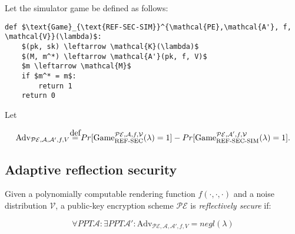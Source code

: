 \documentclass{article}
\newcommand\defeq{\stackrel{\mathclap{\normalfont\mbox{def}}}{=}}
\begin{document}
Let the simulator game be defined as follows:

\begin{lstlisting}[texcl,mathescape]
def $\text{Game}_{\text{REF-SEC-SIM}}^{\mathcal{PE},\mathcal{A'}, f,
\mathcal{V}}(\lambda)$:
    $(pk, sk) \leftarrow \mathcal{K}(\lambda)$
    $(M, m^*) \leftarrow \mathcal{A'}(pk, f, V)$
    $m \leftarrow \mathcal{M}$
    if $m^* = m$:
        return 1
    return 0
\end{lstlisting}

Let

\begin{equation*}
    \text{Adv}_{\mathcal{PE}, \mathcal{A}, \mathcal{A}', f, V}
    \defeq
    Pr[\text{Game}_{\text{REF-SEC}}^{\mathcal{PE},\mathcal{A}, f,
\mathcal{V}}(\lambda) = 1]
    -
    Pr[\text{Game}_{\text{REF-SEC-SIM}}^{\mathcal{PE},\mathcal{A'}, f,
\mathcal{V}}(\lambda) = 1].
\end{equation*}

\subsection*{Adaptive reflection security}

Given a polynomially computable rendering function $f(\cdot, \cdot, \cdot)$ and
a  noise distribution $\mathcal{V}$, a public-key encryption scheme
$\mathcal{PE}$ is \textit{reflectively secure} if:

\begin{equation*}
\forall PPT \mathcal{A}: \exists PPT \mathcal{A}': \text{Adv}_{\mathcal{PE}, \mathcal{A}, \mathcal{A}', f, V} = negl(\lambda)
\end{equation*}
\end{document}
